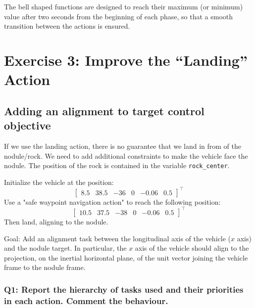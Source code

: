 \documentclass{article}
\begin{document}
The bell shaped functions are designed to reach their maximum (or minimum) value after two seconds from the beginning of each phase, so that a smooth transition between the actions is ensured.

\clearpage

\section{Exercise 3: Improve the “Landing” Action}
\subsection{Adding an alignment to target control objective}
If we use the landing action, there is no guarantee that we land in from of the nodule/rock. We need to add additional constraints to make the vehicle face the nodule. The position of the rock is contained in the variable \texttt{rock\_center}.

Initialize the vehicle at the position:
\begin{displaymath}
\begin{bmatrix} 8.5 & 38.5 & -36 & 0 & -0.06 & 0.5 \end{bmatrix}^\top
\end{displaymath}
Use a "safe waypoint navigation action" to reach the following position:
\begin{displaymath}
\begin{bmatrix} 10.5 & 37.5 & -38 & 0 & -0.06 & 0.5 \end{bmatrix}^\top
\end{displaymath}
Then land, aligning to the nodule.

Goal: Add an alignment task between the longitudinal axis of the vehicle ($x$ axis) and the nodule target. In particular, the $x$ axis of the vehicle should align to the projection, on the inertial horizontal plane, of the unit vector joining the vehicle frame to the nodule frame.

\subsubsection{Q1: Report the hierarchy of tasks used and their priorities in each action. Comment the behaviour.}
\end{document}
